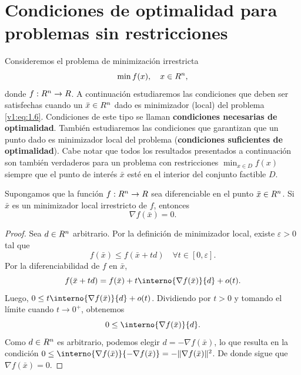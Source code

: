 
\section{Condiciones de optimalidad para problemas sin restricciones}
\label{v1:sec:1.3}

Consideremos el problema de minimización irrestricta
\begin{equation}
 \min f(x), \quad x \in R^n, \label{v1:eq:1.6}
\end{equation}
donde $f : R^n \to R$. A continuación estudiaremos las condiciones que deben ser satisfechas cuando un $\bar{x} \in R^n$ dado es minimizador (local) del problema \eqref{v1:eq:1.6}. Condiciones de este tipo se llaman \textbf{condiciones necesarias de optimalidad}. También estudiaremos las condiciones que garantizan que un punto dado es minimizador local del problema (\textbf{condiciones suficientes de optimalidad}). Cabe notar que todos los resultados presentados a continuación son también verdaderos para un problema con restricciones $\min_{x \in D} f(x)$ siempre que el punto de interés $\bar{x}$ esté en el interior del conjunto factible $D$.

\begin{theorem}\label{v1:thm:1.3.1}
 Supongamos que la función $f : R^n \to R$ sea diferenciable en el punto $\bar{x} \in R^n$.
 Si $\bar{x}$ es un minimizador local irrestricto de $f$, entonces
 \begin{equation}
 \nabla f(\bar{x}) = 0. \label{v1:eq:1.7}
 \end{equation}
\end{theorem}

\begin{proof}
 Sea $d \in R^n$ arbitrario. Por la definición de minimizador local, existe $\varepsilon > 0$ tal que
 \[
 f(\bar{x}) \le f(\bar{x} + td) \quad \forall t \in [0, \varepsilon].
 \]
 Por la diferenciabilidad de $f$ en $\bar{x}$,
 \[
 f(\bar{x} + td) = f(\bar{x}) + t\interno{\nabla f(\bar{x})}{d} + o(t).
 \]
 Luego, $0 \le t\interno{\nabla f(\bar{x})}{d} + o(t)$.
 Dividiendo por $t > 0$ y tomando el límite cuando $t \to 0^+$, obtenemos
 \[
 0 \le \interno{\nabla f(\bar{x})}{d}.
 \]
 Como $d \in R^n$ es arbitrario, podemos elegir $d = -\nabla f(\bar{x})$, lo que resulta en la condición $0 \le \interno{\nabla f(\bar{x})}{-\nabla f(\bar{x})} = -\norm{\nabla f(\bar{x})}^2$. De donde sigue que $\nabla f(\bar{x}) = 0$.
\end{proof}

